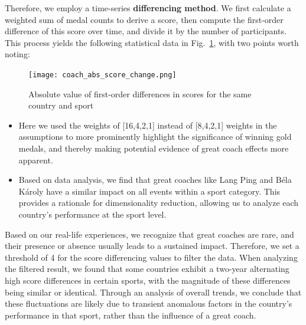 \documentclass{mcmthesis}
\begin{document}
Therefore, we employ a time-series \textbf{differencing method}. We first calculate a weighted sum of medal counts to derive a score, then compute the first-order difference of this score over time, and divide it by the number of participants. This process yields the following statistical data in Fig.~\ref{fig:coach_abs_score_change}, with two points worth noting:

\begin{figure}[h!]
    \centering
    \texttt{[image: coach\_abs\_score\_change.png]}
    \caption{Absolute value of first-order differences in scores for the same country and sport}
    \label{fig:coach_abs_score_change}
\end{figure}

\begin{itemize}
    \item[1)] Here we used the weights of [16,4,2,1] instead of [8,4,2,1] weights in the assumptions to more prominently highlight the significance of winning gold medals, and thereby making potential evidence of great coach effects more apparent.
    \item[2)] Based on data analysis, we find that great coaches like Lang Ping\cite{3} and Béla Károly\cite{4} have a similar impact on all events within a sport category. This provides a rationale for dimensionality reduction, allowing us to analyze each country's performance at the sport level.
\end{itemize}

Based on our real-life experiences, we recognize that great coaches are rare, and their presence or absence usually leads to a sustained impact. Therefore, we set a threshold of 4 for the score differencing values to filter the data. When analyzing the filtered result, we found that some countries exhibit a two-year alternating high score differences in certain sports, with the magnitude of these differences being similar or identical. Through an analysis of overall trends, we conclude that these fluctuations are likely due to transient anomalous factors in the country's performance in that sport, rather than the influence of a great coach.
\end{document}
